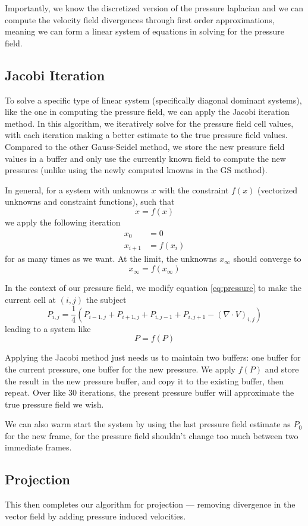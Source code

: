 \documentclass[11pt]{article}
\begin{document}
Importantly, we know the discretized version of the pressure laplacian and we can compute the velocity field divergences through first order approximations, meaning we can form a linear system of equations in solving for the pressure field.

\subsection{Jacobi Iteration}
To solve a specific type of linear system (specifically diagonal dominant systems), like the one in computing the pressure field, we can apply the Jacobi iteration method. In this algorithm, we iteratively solve for the pressure field cell values, with each iteration making a better estimate to the true pressure field values. Compared to the other Gauss-Seidel method, we store the new pressure field values in a buffer and only use the currently known field to compute the new pressures (unlike using the newly computed knowns in the GS method).

In general, for a system with unknowns $x$ with the constraint $f(x)$ (vectorized unknowns and constraint functions), such that
\[
	x = f(x)
\]
we apply the following iteration
\begin{align*}
	x_0 &= 0\\
	x_{i+1} &= f(x_i)
\end{align*}
for as many times as we want. At the limit, the unknowns $x_\infty$ should converge to
\[
	x_\infty = f(x_\infty)
\]

In the context of our pressure field, we modify equation \ref{eq:pressure} to make the current cell at $(i, j)$ the subject
\[
	P_{i,j} = \frac{1}{4} \left( P_{i-1, j} + P_{i+1, j} + P_{i, j-1} + P_{i, j+1} - (\nabla \cdot V)_{i,j} \right)
\]
leading to a system like
\[
	P = f(P)
\]

Applying the Jacobi method just needs us to maintain two buffers: one buffer for the current pressure, one buffer for the new pressure. We apply $f(P)$ and store the result in the new pressure buffer, and copy it to the existing buffer, then repeat. Over like 30 iterations, the present pressure buffer will approximate the true pressure field we wish.

We can also warm start the system by using the last pressure field estimate as $P_0$ for the new frame, for the pressure field shouldn't change too much between two immediate frames.


\subsection{Projection}
This then completes our algorithm for projection --- removing divergence in the vector field by adding pressure induced velocities.
\end{document}
